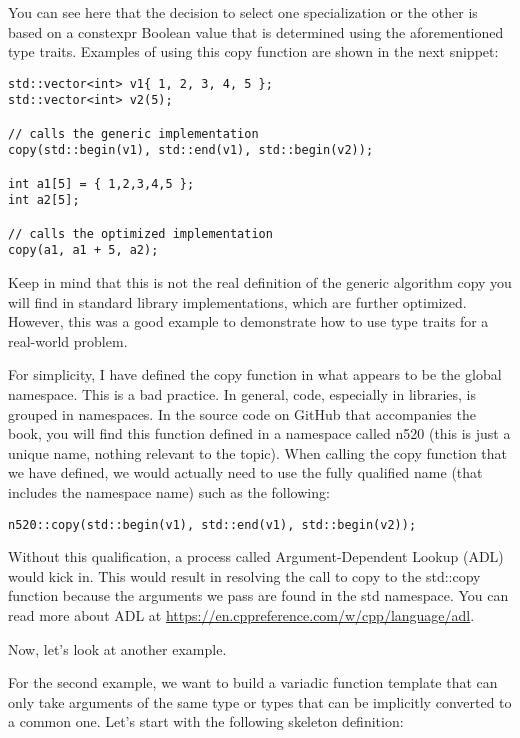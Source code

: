 You can see here that the decision to select one specialization or the other is based on a constexpr Boolean value that is determined using the aforementioned type traits. Examples of using this copy function are shown in the next snippet:

\begin{lstlisting}[style=styleCXX]
std::vector<int> v1{ 1, 2, 3, 4, 5 };
std::vector<int> v2(5);

// calls the generic implementation
copy(std::begin(v1), std::end(v1), std::begin(v2));

int a1[5] = { 1,2,3,4,5 };
int a2[5];

// calls the optimized implementation
copy(a1, a1 + 5, a2);
\end{lstlisting}

Keep in mind that this is not the real definition of the generic algorithm copy you will find in standard library implementations, which are further optimized. However, this was a good example to demonstrate how to use type traits for a real-world problem.

For simplicity, I have defined the copy function in what appears to be the global namespace. This is a bad practice. In general, code, especially in libraries, is grouped in namespaces. In the source code on GitHub that accompanies the book, you will find this function defined in a namespace called n520 (this is just a unique name, nothing relevant to the topic). When calling the copy function that we have defined, we would actually need to use the fully qualified name (that includes the namespace name) such as the following:

\begin{lstlisting}[style=styleCXX]
n520::copy(std::begin(v1), std::end(v1), std::begin(v2));
\end{lstlisting}

Without this qualification, a process called Argument-Dependent Lookup (ADL) would kick in. This would result in resolving the call to copy to the std::copy function because the arguments we pass are found in the std namespace. You can read more about ADL at \url{https://en.cppreference.com/w/cpp/language/adl}.

Now, let’s look at another example.


For the second example, we want to build a variadic function template that can only take arguments of the same type or types that can be implicitly converted to a common one.
Let’s start with the following skeleton definition:

